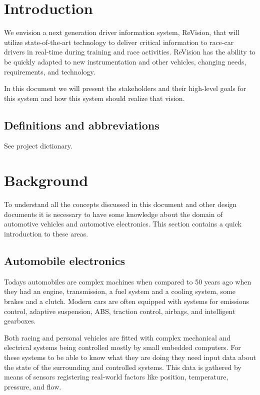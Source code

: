 
\section{Introduction}

We envision a next generation driver information system, ReVision, that will utilize
state-of-the-art technology to deliver critical information to race-car drivers
in real-time during training and race activities. ReVision has the ability 
to be quickly adapted to new instrumentation and other vehicles, changing 
needs, requirements, and technology.

In this document we will present the stakeholders and their high-level goals for this system and
how this system should realize that vision.

\subsection{Definitions and abbreviations}
See project dictionary.

\section{Background}
To understand all the concepts discussed in this document and other design
documents it is necessary to have some knowledge about the domain of automotive
vehicles and automotive electronics. This section contains a quick introduction
to these areas.

\subsection{Automobile electronics}
Todays automobiles are complex machines when compared to 50 years ago when they
had an engine, transmission, a fuel system and a cooling system, some brakes
and a clutch. Modern cars are often equipped with systems for emissions control, adaptive suspension, ABS, traction control, airbags, and
intelligent gearboxes.

Both racing  and  personal vehicles are fitted with complex mechanical and electrical
systems being controlled mostly by small embedded computers. For these systems
to be able to know what they are doing they need input data about the state of
the surrounding and controlled systems. This data is gathered by means of
sensors registering real-world factors like position, temperature, pressure,
and flow.

